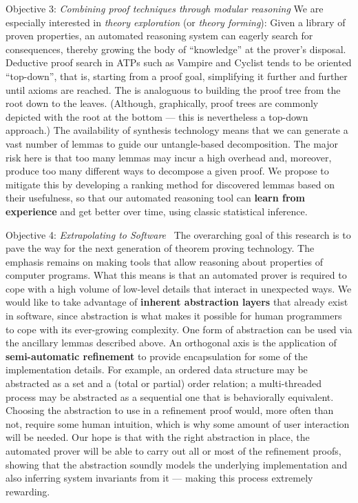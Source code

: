 \begin{paragraph}{Objective 3: {\it Combining proof techniques through modular reasoning}}
We are especially interested in \emph{theory exploration} (or \emph{theory forming}):
Given a library of proven properties, an automated reasoning system can eagerly search for consequences, thereby growing the body of ``knowledge'' at the prover's disposal.
Deductive proof search in ATPs such as Vampire and Cyclist tends to be oriented ``top-down'', that is,
starting from a proof goal, simplifying it further and further until axioms are reached.
The is analoguous to building the proof tree from the root down to the leaves. (Although, graphically, proof trees are commonly depicted with the root at the bottom --- this is nevertheless a top-down approach.)
The availability of synthesis technology \cite{quickspec,thesy} means that we can generate a vast number of lemmas to guide our untangle-based decomposition.
The major risk here is that too many lemmas may incur a high overhead and, moreover, produce too many different ways to decompose a given proof.
We propose to mitigate this by developing a ranking method for discovered lemmas based on their usefulness,
so that our automated reasoning tool can \textbf{learn from experience} and get better over time, using classic statistical inference.
\end{paragraph}

\begin{paragraph}{Objective 4: {\it Extrapolating to Software}}~
The overarching goal of this research is to pave the way for the next generation of theorem proving technology.
The emphasis remains on making tools that allow reasoning about properties of computer programs.
What this means is that an automated prover is required to cope with a high volume of low-level details that interact in unexpected ways.
We would like to take advantage of \textbf{inherent abstraction layers} that already exist in software,
since abstraction is what makes it possible
for human programmers to cope with its ever-growing complexity.
One form of abstraction can be used via the ancillary lemmas described above.
An orthogonal axis is the application of \textbf{semi-automatic refinement} to provide encapsulation for some of the implementation details.
For example, an ordered data structure may be abstracted as a set and a (total or partial) order relation; a multi-threaded process may be abstracted as a sequential one that is behaviorally equivalent.
Choosing the abstraction to use in a refinement proof would, more often than not, require some human intuition, which is why some amount of user interaction will be needed.
Our hope is that with the right abstraction in place,  the automated prover will be able to carry out all or most of the refinement proofs,
showing that the abstraction soundly models the underlying implementation and also inferring system invariants from it --- making this process extremely rewarding.
\end{paragraph}



